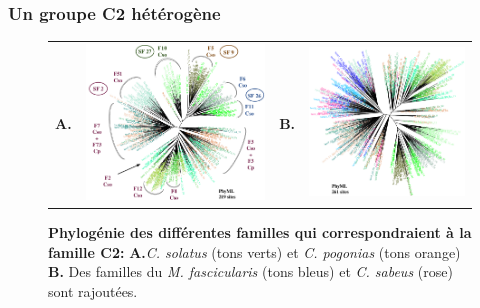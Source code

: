 \documentclass[12pt,a4paper]{article}
\begin{document}
	\subsubsection{Un groupe C2 hétérogène}
			\begin{figure}
			\center	
			\begin{tabular}{cccc}
		\textbf{A.} & \includegraphics[scale=0.30]{img/tree_C2_pogonias_solatus.png} & \textbf{B.} & \includegraphics[scale=0.30]{img/tree_C2_all_species.png} \\
	\end{tabular}
	\caption{\textbf{Phylogénie des différentes familles qui correspondraient à la famille C2:}
	\textbf{A.}\textit{C. solatus} (tons verts) et \textit{C. pogonias} (tons orange) \textbf{B.} Des familles du \textit{M. fascicularis} (tons bleus) et \textit{C. sabeus} (rose) sont rajoutées.	 
	\label{tree_C2}} 
\end{figure}
\end{document}
